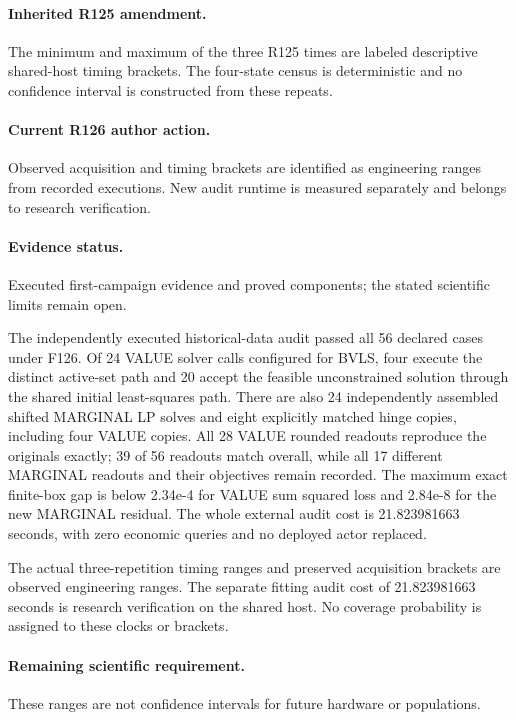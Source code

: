 \paragraph{Inherited R125 amendment.} The minimum and maximum of the three R125 times are labeled descriptive shared-host timing brackets. The four-state census is deterministic and no confidence interval is constructed from these repeats.

\paragraph{Current R126 author action.} Observed acquisition and timing brackets are identified as engineering ranges from recorded executions. New audit runtime is measured separately and belongs to research verification.

\paragraph{Evidence status.} Executed first-campaign evidence and proved components; the stated scientific limits remain open.

The independently executed historical-data audit passed all 56 declared cases under F126. Of 24 VALUE solver calls configured for BVLS, four execute the distinct active-set path and 20 accept the feasible unconstrained solution through the shared initial least-squares path. There are also 24 independently assembled shifted MARGINAL LP solves and eight explicitly matched hinge copies, including four VALUE copies. All 28 VALUE rounded readouts reproduce the originals exactly; 39 of 56 readouts match overall, while all 17 different MARGINAL readouts and their objectives remain recorded. The maximum exact finite-box gap is below 2.34e-4 for VALUE sum squared loss and 2.84e-8 for the new MARGINAL residual. The whole external audit cost is 21.823981663 seconds, with zero economic queries and no deployed actor replaced.\par
The actual three-repetition timing ranges and preserved acquisition brackets are observed engineering ranges. The separate fitting audit cost of 21.823981663 seconds is research verification on the shared host. No coverage probability is assigned to these clocks or brackets.\par

\paragraph{Remaining scientific requirement.} These ranges are not confidence intervals for future hardware or populations.

